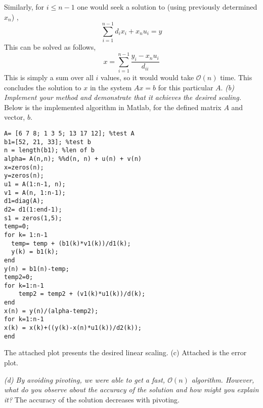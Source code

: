 \documentclass{article}
\begin{document}
Similarly, for $i \leq n-1$ one would seek a solution to (using previously determined $x_{n}$) , 
$$\sum_{i=1}^{n-1} d_{i}x_{i}+ x_{n}u_{i} = y $$ 
 This can be solved as follows, 
 $$x = \sum_{i=1}^{n-1} \frac{y_{i} - x_{n}u_{i}}{  d_{ii}} $$
This is simply a sum over all $i$ values, so it would would take $\mathcal{O}(n)$ time.  This concludes the solution to $x$ in the  system $Ax = b$ for this particular $A$. \newline \newline 
\emph{(b) Implement your method and demonstrate that it achieves the desired scaling.} 
\newline 
Below is the implemented algorithm in Matlab, for the defined matrix $A$ and vector, $b$. 
\begin{lstlisting}
A= [6 7 8; 1 3 5; 13 17 12]; %test A 
b1=[52, 21, 33]; %test b 
n = length(b1); %len of b 
alpha= A(n,n); %%d(n, n) + u(n) + v(n) 
x=zeros(n); 
y=zeros(n); 
u1 = A(1:n-1, n); 
v1 = A(n, 1:n-1); 
d1=diag(A); 
d2= d1(1:end-1); 
s1 = zeros(1,5);
temp=0;
for k= 1:n-1  
  temp= temp + (b1(k)*v1(k))/d1(k); 
  y(k) = b1(k); 
end  
y(n) = b1(n)-temp;  
temp2=0; 
for k=1:n-1 
    temp2 = temp2 + (v1(k)*u1(k))/d(k); 
end
x(n) = y(n)/(alpha-temp2);
for k=1:n-1 
x(k) = x(k)+((y(k)-x(n)*u1(k))/d2(k)); 
end 
\end{lstlisting}
The attached plot presents the desired linear scaling. 
\newline 
(c) Attached is the error plot. 


\emph{(d) By avoiding pivoting, we were able to get a fast, $\mathcal{O}(n)$ algorithm. However, what do you observe about the accuracy of the solution and how might you explain it? } 
The accuracy of the solution decreases with pivoting.
\newline 
\end{document}
